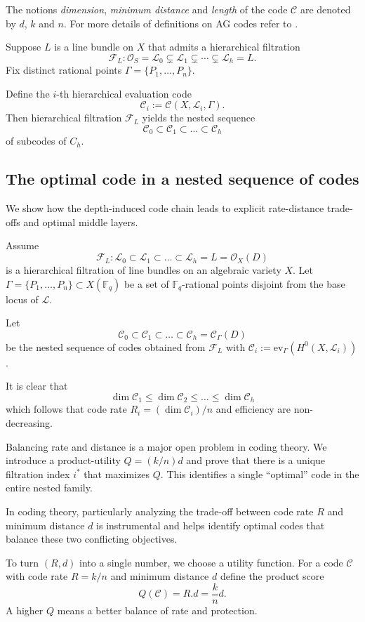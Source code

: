 \documentclass[14pt]{amsart}
\theoremstyle{plain}
\theoremstyle{definition}
\theoremstyle{remark}
\theoremstyle{example}
\def \F{\mathbb{F}}
\def \L{\mathcal{L}}
\def \O{\mathcal{O}}
\def \C{\mathcal{C}}
\def \FF{\mathcal{F}}
\def \ev{\mathrm{ev}}
\begin{document}
The notions \textit{dimension}, \textit{minimum distance} and \textit{length} of the code $\C$ are denoted by $d$, $k$ and $n$. For more details of definitions on AG codes refer to \cite{Au, HoLiPe, St, Ts}.

Suppose $L$ is a line bundle on $X$ that admits a hierarchical filtration
$$\FF_L:\O_S=\L_0\subsetneq \L_1\subsetneq \cdots \subsetneq\L_h=L.$$
Fix distinct rational points $\Gamma=\{P_1,\ldots,P_n\}$.

Define the $i$-th hierarchical evaluation code
$$\C_i:=\C(X,\L_i,\Gamma).$$
Then hierarchical filtration $\FF_L$ yields the nested sequence
$$\C_0\subset\C_1\subset\ldots\subset\C_h$$ 
of subcodes of $C_h$. 

\subsection{The optimal code in a nested sequence of codes} 
We show how the depth-induced code chain leads to explicit rate-distance trade-offs and optimal middle layers.

Assume
$$\FF_L:\L_0\subset\L_1\subset\ldots\subset\L_h=L=\O_X(D)$$
is a hierarchical filtration of line bundles on an algebraic variety $X$. Let $\Gamma =\{P_1,\dots,P_n\} \subset X(\F_q)$ be a set of $\F_q$-rational points disjoint from the base locus of $\L$.

Let
$$\C_0\subset\C_1\subset\ldots\subset\C_h=\C_\Gamma(D)$$
be the nested sequence of codes obtained from $\FF_L$ with $\C_i:=\ev_\Gamma(H^0(X,\L_i))$.
 
It is clear that 
$$\dim\C_1\leq\dim\C_2\leq\ldots\leq\dim\C_h$$
which follows that code rate $R_i=(\dim\C_i)/n$ and efficiency are non-decreasing.

Balancing rate and distance is a major open problem in coding theory. We introduce a product-utility $Q=(k/n)d$ and prove that there is a unique filtration index $i^*$ that maximizes $Q$.  This identifies a single ``optimal'' code in the entire nested family.

In coding theory, particularly analyzing the trade-off between code rate $R$ and minimum distance $d$ is instrumental and helps identify optimal codes that balance these two conflicting objectives.

To turn $(R,d)$ into a single number, we choose a utility function. For a code $\C$ with code rate $R=k/n$ and minimum distance $d$ define the product score $$Q(\C)=R.d=\frac{k}{n}d.$$
A higher $Q$ means a better balance of rate and protection.
\end{document}
